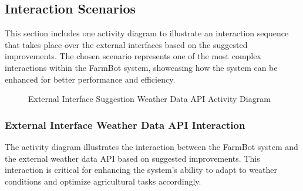 \subsection{Interaction Scenarios}

This section includes one activity diagram to illustrate an interaction sequence that takes place over the external interfaces based on the suggested improvements. The chosen scenario represents one of the most complex interactions within the FarmBot system, showcasing how the system can be enhanced for better performance and efficiency.

\begin{figure}[H]
    \centering
    
    \caption{External Interface Suggestion Weather Data API Activity Diagram}
\end{figure}

\subsubsection{External Interface Weather Data API Interaction}

The activity diagram illustrates the interaction between the FarmBot system and the external weather data API based on suggested improvements. This interaction is critical for enhancing the system's ability to adapt to weather conditions and optimize agricultural tasks accordingly.

